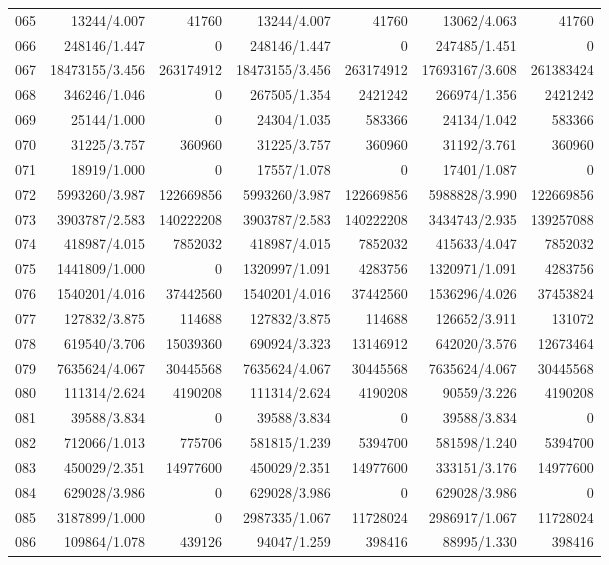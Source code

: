 \begin{longtable}{crrrrrr}
065 & 13244/4.007 & 41760 & 13244/4.007 & 41760 & 13062/4.063 & 41760 \\
066 & 248146/1.447 & 0 & 248146/1.447 & 0 & 247485/1.451 & 0 \\
067 & 18473155/3.456 & 263174912 & 18473155/3.456 & 263174912 & 17693167/3.608 & 261383424 \\
068 & 346246/1.046 & 0 & 267505/1.354 & 2421242 & 266974/1.356 & 2421242 \\
069 & 25144/1.000 & 0 & 24304/1.035 & 583366 & 24134/1.042 & 583366 \\
070 & 31225/3.757 & 360960 & 31225/3.757 & 360960 & 31192/3.761 & 360960 \\
071 & 18919/1.000 & 0 & 17557/1.078 & 0 & 17401/1.087 & 0 \\
072 & 5993260/3.987 & 122669856 & 5993260/3.987 & 122669856 & 5988828/3.990 & 122669856 \\
073 & 3903787/2.583 & 140222208 & 3903787/2.583 & 140222208 & 3434743/2.935 & 139257088 \\
074 & 418987/4.015 & 7852032 & 418987/4.015 & 7852032 & 415633/4.047 & 7852032 \\
075 & 1441809/1.000 & 0 & 1320997/1.091 & 4283756 & 1320971/1.091 & 4283756 \\
076 & 1540201/4.016 & 37442560 & 1540201/4.016 & 37442560 & 1536296/4.026 & 37453824 \\
077 & 127832/3.875 & 114688 & 127832/3.875 & 114688 & 126652/3.911 & 131072 \\
078 & 619540/3.706 & 15039360 & 690924/3.323 & 13146912 & 642020/3.576 & 12673464 \\
079 & 7635624/4.067 & 30445568 & 7635624/4.067 & 30445568 & 7635624/4.067 & 30445568 \\
080 & 111314/2.624 & 4190208 & 111314/2.624 & 4190208 & 90559/3.226 & 4190208 \\
081 & 39588/3.834 & 0 & 39588/3.834 & 0 & 39588/3.834 & 0 \\
082 & 712066/1.013 & 775706 & 581815/1.239 & 5394700 & 581598/1.240 & 5394700 \\
083 & 450029/2.351 & 14977600 & 450029/2.351 & 14977600 & 333151/3.176 & 14977600 \\
084 & 629028/3.986 & 0 & 629028/3.986 & 0 & 629028/3.986 & 0 \\
085 & 3187899/1.000 & 0 & 2987335/1.067 & 11728024 & 2986917/1.067 & 11728024 \\
086 & 109864/1.078 & 439126 & 94047/1.259 & 398416 & 88995/1.330 & 398416 \\

\end{longtable}
